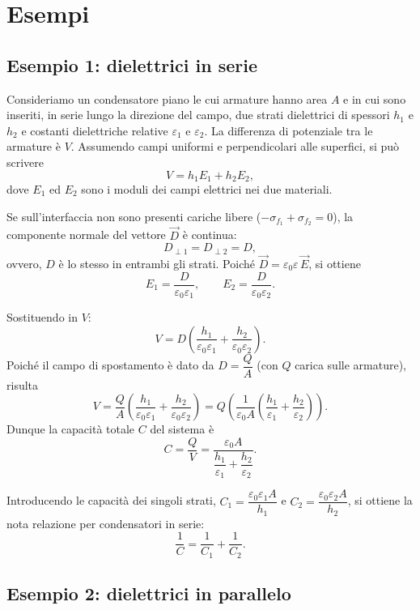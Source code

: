 \documentclass{book}
\begin{document}
\section{Esempi}

\subsection*{Esempio 1: dielettrici in serie}

Consideriamo un condensatore piano le cui armature hanno area \(A\) e in cui sono inseriti, in serie lungo la direzione del campo, due strati dielettrici di spessori \(h_1\) e \(h_2\) e costanti dielettriche relative \(\varepsilon_1\) e \(\varepsilon_2\). La differenza di potenziale tra le armature è \(V\). Assumendo campi uniformi e perpendicolari alle superfici, si può scrivere
\[
V = h_1 E_1 + h_2 E_2,
\]
dove \(E_1\) ed \(E_2\) sono i moduli dei campi elettrici nei due materiali.

Se sull'interfaccia non sono presenti cariche libere ($-\sigma_{{f}_{1}}+ \sigma_{{f}_{2}} = 0$), la componente normale del vettore \(\vec{D}\) è continua:
\[
D_{\perp1} = D_{\perp2} = D,
\]
ovvero, \(D\) è lo stesso in entrambi gli strati. Poiché \(\vec{D}=\varepsilon_0\varepsilon\,\vec{E}\), si ottiene
\[
E_1 = \frac{D}{\varepsilon_0\varepsilon_1},\qquad
E_2 = \frac{D}{\varepsilon_0\varepsilon_2}.
\]

Sostituendo in \(V\):
\[
V = D\left(\frac{h_1}{\varepsilon_0\varepsilon_1}+\frac{h_2}{\varepsilon_0\varepsilon_2}\right).
\]
Poiché il campo di spostamento è dato da \(D = \dfrac{Q}{A}\) (con \(Q\) carica sulle armature), risulta
\[
V = \frac{Q}{A}\left(\frac{h_1}{\varepsilon_0\varepsilon_1}+\frac{h_2}{\varepsilon_0\varepsilon_2}\right)
= Q\left(\frac{1}{\varepsilon_0 A}\left(\frac{h_1}{\varepsilon_1}+\frac{h_2}{\varepsilon_2}\right)\right).
\]
Dunque la capacità totale \(C\) del sistema è
\[
C=\frac{Q}{V}=\frac{\varepsilon_0 A}{\dfrac{h_1}{\varepsilon_1}+\dfrac{h_2}{\varepsilon_2}}.
\]

Introducendo le capacità dei singoli strati, \(C_1=\dfrac{\varepsilon_0\varepsilon_1 A}{h_1}\) e \(C_2=\dfrac{\varepsilon_0\varepsilon_2 A}{h_2}\), si ottiene la nota relazione per condensatori in serie:
\[
\frac{1}{C}=\frac{1}{C_1}+\frac{1}{C_2}.
\]

\subsection*{Esempio 2: dielettrici in parallelo}
\end{document}
